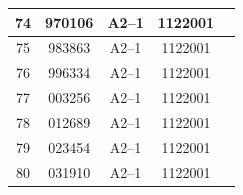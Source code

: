 \documentclass[UTF8,10pt,a4paper,fontset=fandol]{ctexart}
\newcommand{\fieldvalue}[1]{#1}
\begin{document}
\begin{center}
\begin{tabular}{|c|c|c|c|c|}
\fieldvalue{74} &
\fieldvalue{970106} &
\fieldvalue{A2--1} &
\fieldvalue{1122001} & \\ \hline

\fieldvalue{75} &
\fieldvalue{983863} &
\fieldvalue{A2--1} &
\fieldvalue{1122001} & \\ \hline

\fieldvalue{76} &
\fieldvalue{996334} &
\fieldvalue{A2--1} &
\fieldvalue{1122001} & \\ \hline

\fieldvalue{77} &
\fieldvalue{003256} &
\fieldvalue{A2--1} &
\fieldvalue{1122001} & \\ \hline

\fieldvalue{78} &
\fieldvalue{012689} &
\fieldvalue{A2--1} &
\fieldvalue{1122001} & \\ \hline

\fieldvalue{79} &
\fieldvalue{023454} &
\fieldvalue{A2--1} &
\fieldvalue{1122001} & \\ \hline

\fieldvalue{80} &
\fieldvalue{031910} &
\fieldvalue{A2--1} &
\fieldvalue{1122001} & \\ \hline


\end{tabular}
\end{center}
\end{document}
